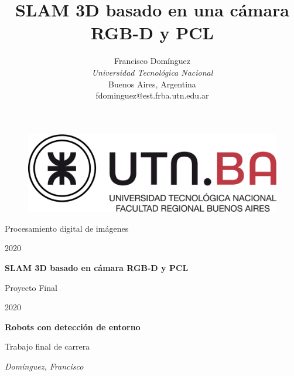 \documentclass[conference]{IEEEtran}
\numberwithin{equation}{section}
\begin{document}
\ifimagenes
\ifimagenespaper
\title{SLAM 3D basado en una cámara RGB-D y PCL}

\author{{Francisco Domínguez}\\
{\textit{Universidad Tecnológica Nacional}\\
Buenos Aires, Argentina \\
fdominguez@est.frba.utn.edu.ar}
}
\date{}
\maketitle









\else
\begin{titlepage}
\centering
\begin{figure}[t]
	\centering
	\includegraphics[scale=0.15]{utn.jpg}
    \vspace{0.5cm}
\end{figure}%
\ifimagenes
	{\LARGE Procesamiento digital de imágenes\par}
    {\LARGE 2020\par}
	\vspace{1cm}
	{\huge\bfseries SLAM 3D basado en cámara RGB-D y PCL\par}
\else
	{\LARGE Proyecto Final\par}
    {\LARGE 2020\par}
	\vspace{1cm}
	{\huge\bfseries Robots con detección de entorno\par}
	\vspace{1cm}
    {\LARGE Trabajo final de carrera\par}
\fi
    \vspace{1cm}
	{\Large\itshape Domínguez, Francisco\par}
	\vfill
\end{titlepage}

\tableofcontents

\newpage
\listoffigures
\ifimagenes
\else
\newpage
\listoftables
\newpage

\fi
\end{document}
